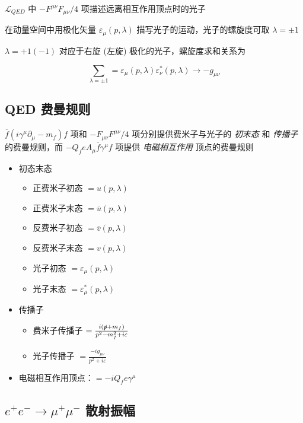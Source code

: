 \documentclass[oneside,a4paper,openany,11pt]{ctexbook}
\begin{document}
$\mathcal{L}_{QED}$ 中 $-F^{\mu\nu} F_{\mu\nu}/4$ 项描述远离相互作用顶点时的光子

在动量空间中用极化矢量 $\varepsilon_\mu(p, \lambda)$ 描写光子的运动，光子的螺旋度可取 $\lambda = \pm 1$

$\lambda = +1 (-1)$ 对应于右旋 (左旋) 极化的光子，螺旋度求和关系为

\begin{equation}
    \sum_{\lambda=\pm 1} = \varepsilon_\mu(p, \lambda) \varepsilon^*_\nu(p, \lambda) \to -g_{\mu\nu}
\end{equation}

\subsection{QED 费曼规则}

$\overline{f} (i \gamma^\mu \partial_\mu - m_f) f$ 项和 $-F_{\mu\nu} F^{\mu\nu}/4$ 项分别提供费米子与光子的 \emph{初末态} 和 \emph{传播子} 的费曼规则，而 $-Q_f e A_\mu \overline{f} \gamma^\mu f$ 项提供 \emph{电磁相互作用} 顶点的费曼规则

\begin{itemize}
    \item 初态末态
        \begin{itemize}
            \item 正费米子初态 $=u(p, \lambda)$
            \item 正费米子末态 $=\overline{u}(p, \lambda)$
            \item 反费米子初态 $=\overline{v}(p, \lambda)$
            \item 反费米子末态 $=v(p, \lambda)$
            \item 光子初态 $=\varepsilon_\mu(p, \lambda)$
            \item 光子末态 $=\varepsilon^*_\mu(p, \lambda)$
        \end{itemize}
    \item 传播子
        \begin{itemize}
            \item 费米子传播子 $=\frac{i(\slashed{p} + m_f)}{p^2 - m_f^2 + i\varepsilon}$
            \item 光子传播子 $=\frac{-i g_{\mu\nu}}{p^2 + i\varepsilon}$
        \end{itemize}
    \item 电磁相互作用顶点：$=-i Q_f e \gamma^\mu$
\end{itemize}

\subsection{\texorpdfstring{$e^+ e^- \to \mu^+ \mu^-$}{e+e- -> mu+mu-} 散射振幅}
\end{document}
